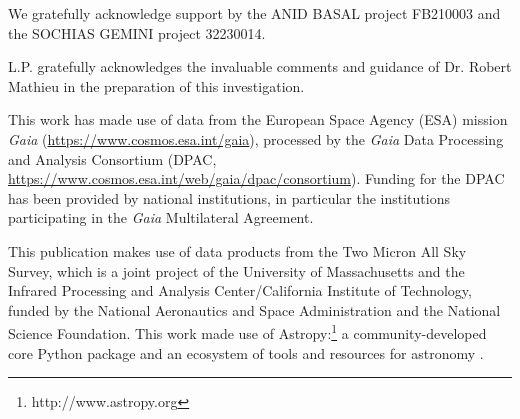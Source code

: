 \documentclass{aa}
\begin{document}
\begin{acknowledgements}
We gratefully acknowledge support by the ANID BASAL project FB210003 and the SOCHIAS GEMINI project 32230014.

L.P. gratefully acknowledges the invaluable comments and guidance of Dr. Robert Mathieu in the preparation of this investigation.

This work has made use of data from the European Space Agency (ESA) mission \textit{Gaia} (\url{https://www.cosmos.esa.int/gaia}), processed by the \textit{Gaia} Data Processing and Analysis Consortium (DPAC, \url{https://www.cosmos.esa.int/web/gaia/dpac/consortium}). Funding for the DPAC has been provided by national institutions, in particular the institutions participating in the \textit{Gaia} Multilateral Agreement. 

This publication makes use of data products from the Two Micron All Sky Survey, which is a joint project of the University of Massachusetts and the Infrared Processing and Analysis Center/California Institute of Technology, funded by the National Aeronautics and Space Administration and the National Science Foundation. This work made use of Astropy:\footnote{http://www.astropy.org} a community-developed core Python package and an ecosystem of tools and resources for astronomy \citep{astropy:2013, astropy:2018, astropy:2022}.
\end{acknowledgements}


 
\end{document}

